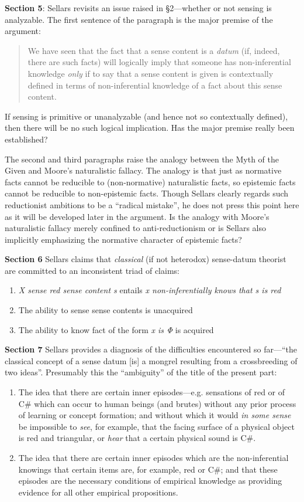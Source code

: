 \documentclass[11pt]{article}
\begin{document}
\textbf{Section 5}: Sellars revisits an issue raised in §2---whether or not sensing is analyzable. The first sentence of the paragraph is the major premise of the argument:
\begin{quote}
    We have seen that the fact that a sense content is a \emph{datum} (if, indeed, there are such facts) will logically imply that someone has non-inferential knowledge \emph{only} if to say that a sense content is given is contextually defined in terms of non-inferential knowledge of a fact about this sense content.
\end{quote}
If sensing is primitive or unanalyzable (and hence not so contextually defined), then there will be no such logical implication. Has the major premise really been established?

The second and third paragraphs raise the analogy between the Myth of the Given and Moore's naturalistic fallacy. The analogy is that just as normative facts cannot be reducible to (non-normative) naturalistic facts, so epistemic facts cannot be reducible to non-epistemic facts. Though Sellars clearly regards such reductionist ambitions to be a ``radical mistake'', he does not press this point here as it will be developed later in the argument. Is the analogy with Moore's naturalistic fallacy merely confined to anti-reductionism or is Sellars also implicitly emphasizing the normative character of epistemic facts?

\textbf{Section 6} Sellars claims that \emph{classical} (if not heterodox) sense-datum theorist are committed to an inconsistent triad of claims:
\begin{enumerate}
    \item \emph{X sense red sense content s} entails \emph{x non-inferentially knows that s is red}
    \item The ability to sense sense contents is unacquired
    \item The ability to know fact of the form \emph{x is Φ} is acquired
\end{enumerate}

\textbf{Section 7} Sellars provides a diagnosis of the difficulties encountered so far---``the classical concept of a sense datum [is] a mongrel resulting from a crossbreeding of two ideas''. Presumably this the ``ambiguity'' of the title of the present part:
\begin{enumerate}
    \item The idea that there are certain inner episodes---e.g. sensations of red or of C\# which can occur to human beings (and brutes) without any prior process of learning or concept formation; and without which it would \emph{in some sense} be impossible to \emph{see}, for example, that the facing surface of a physical object is red and triangular, or \emph{hear} that a certain physical sound is C\#.
    \item The idea that there are certain inner episodes which are the non-inferential knowings that certain items are, for example, red or C\#; and that these episodes are the necessary conditions of empirical knowledge as providing evidence for all other empirical propositions.
\end{enumerate}
\end{document}
